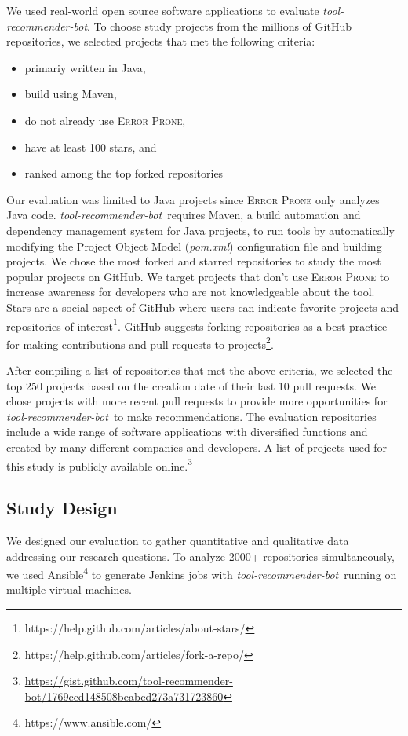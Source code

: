 \documentclass[sigconf,review,anonymous]{acmart}
\newcommand{\tool}{\textsl{tool-recommender-bot}}
\begin{document}
We used real-world open source software applications to evaluate \tool. To choose study projects from the millions of GitHub repositories, we selected projects that met the following criteria:

\begin{itemize}
\item primariy written in Java,
\item build using Maven,
\item do not already use \textsc{Error Prone},
\item have at least 100 stars, and
\item ranked among the top forked repositories
\end{itemize}

Our evaluation was limited to Java projects since \textsc{Error Prone} only analyzes Java code. \tool~requires Maven, a build automation and dependency management system for Java projects, to run tools by automatically modifying the Project Object Model (\textit{pom.xml}) configuration file and building projects. We chose the most forked and starred repositories to study the most popular projects on GitHub. We target projects that don't use \textsc{Error Prone} to increase awareness for developers who are not knowledgeable about the tool. Stars are a social aspect of GitHub where users can indicate favorite projects and repositories of interest\footnote{https://help.github.com/articles/about-stars/}. GitHub suggests forking repositories as a best practice for making contributions and pull requests to projects\footnote{https://help.github.com/articles/fork-a-repo/}. 

After compiling a list of repositories that met the above criteria, we selected the top 250 projects based on the creation date of their last 10 pull requests. We chose projects with more recent pull requests to provide more opportunities for \tool~to make recommendations. The evaluation repositories include a wide range of software applications with diversified functions and created by many different companies and developers. A list of projects used for this study is publicly available online.\footnote{\url{https://gist.github.com/tool-recommender-bot/1769ccd148508beabcd273a731723860}}

\subsection{Study Design}

We designed our evaluation to gather quantitative and qualitative data addressing our research questions.  To analyze 2000+ repositories simultaneously, we used Ansible\footnote{https://www.ansible.com/} to generate Jenkins jobs with \tool~running on multiple virtual machines.
\end{document}
